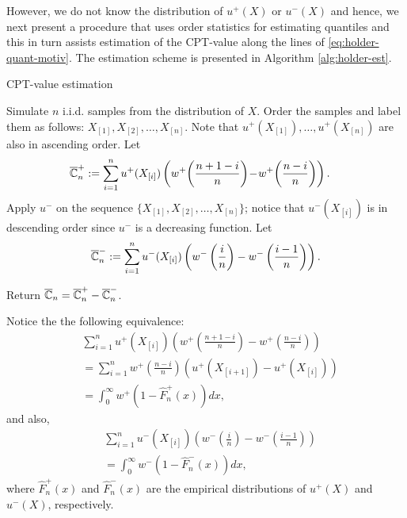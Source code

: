 However, we do not know the distribution of $u^+(X)$ or $u^-(X)$ and hence, we next present a procedure that uses order statistics for estimating quantiles and this in turn assists estimation of the CPT-value along the lines of \eqref{eq:holder-quant-motiv}. The estimation scheme is presented in Algorithm \ref{alg:holder-est}.

\begin{algorithm}
\caption{CPT-value estimation}
\label{alg:holder-est}
\begin{algorithmic}[1]
\State Simulate $n$ i.i.d. samples from the distribution of $X$.
\State Order the samples and label them as follows: 
$X_{[1]}, X_{[2]}, \ldots ,X_{[n]}$. Note that $u^+(X_{[1]}),\ldots ,u^+(X_{[n]})$ are also in ascending order.
\State Let
\vspace{-0.5ex}
$$\hspace{-1.1em}\overline \C_n^+:=\sum_{i=1}^{n} u^+(X_{[i]}) \left(w^+\!\left(\frac{n+1-i}{n}\right)\!-\! w^+\!\left(\frac{n-i}{n}\right) \right).$$
\vspace{-0.5ex}
\State Apply $u^{-}$ on the sequence $\{X_{[1]}, X_{[2]}, \ldots ,X_{[n]}\}$; notice that $u^{-}(X_{[i]})$ is in descending order since $u^{-}$ is a decreasing function.     
\State Let
\vspace{-0.5ex}
$$\overline {\mathbb{C}}_n^-:=\sum_{i=1}^{n} u^-(X_{[i]}) \left(w^-\left(\frac{i}{n}\right)- w^-\left(\frac{i-1}{n}\right) \right). $$

\vspace{-0.5ex}
\State Return $\overline {\mathbb{C}}_n =\overline {\mathbb{C}}_n^+ - \overline {\mathbb{C}}_n^-$.
\end{algorithmic}
\end{algorithm}
Notice the the following equivalence: 
\begin{align*}
&\sum_{i=1}^{n} u^+\left(X_{[i]}\right) \left(w^+\left(\frac{n+1-i}{n}\right) - w^+\left(\frac{n-i}{n}\right)\right) \\
&= \sum_{i=1}^{n} w^+\left(\frac{n-i}{n}\right) \left(u^+\left(X_{[i+1]}\right) - u^+\left(X_{[i]} \right)\right)\\
&=  \int_0^{\infty} w^+\left(1-\hat{F}^+_n\left(x\right)\right) dx, 
\end{align*}
and also,
\begin{align*}
&\sum_{i=1}^{n} u^-\left(X_{[i]}\right) \left(w^-\left(\frac{i}{n}\right) - w^-\left(\frac{i-1}{n}\right)\right)\\
& =  \int_0^{\infty} w^-\left(1-\hat{F}^-_n\left(x\right)\right) dx, 
\end{align*}
where $\hat{F}^+_n\left(x\right)$ and $\hat{F}^-_n\left(x\right)$ are the empirical distributions of $u^+\left(X\right)$
and $u^-\left(X\right)$, respectively.

